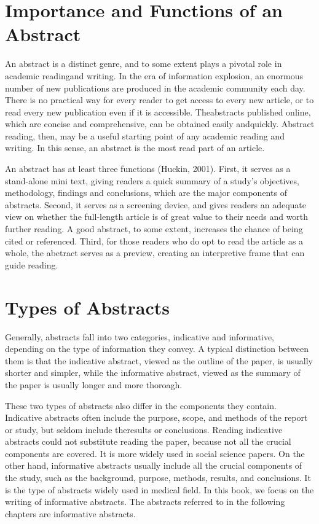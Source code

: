 \documentclass{ctexbook}
\begin{document}
\section{Importance and Functions of an Abstract}

An abstract is a distinct genre, and to some extent plays a pivotal role in academic readingand writing. In the era of information explosion, an enormous number of new publications are produced in the academic community each day. There is no practical way for every reader to get access to every new article, or to read every new publication even if it is accessible. Theabstracts published online, which are concise and comprehensive, can be obtained easily andquickly. Abstract reading, then, may be a useful starting point of any academic reading and writing. In this sense, an abstract is the most read part of an article.

An abstract has at least three functions (Huckin, 2001). First, it serves as a stand-alone mini text, giving readers a quick summary of a study's objectives, methodology, findings and conclusions, which are the major components of abstracts. Second, it serves as a screening device, and gives readers an adequate view on whether the full-length article is of great value to their needs and worth further reading. A good abstract, to some extent, increases the chance of being cited or referenced. Third, for those readers who do opt to read the article as a whole, the abetract serves as a preview, creating an interpretive frame that can guide reading.

\section{Types of Abstracts}

Generally, abstracts fall into two categories, indicative and informative, depending on the type of information they convey. A typical distinction between them is that the indicative abstract, viewed as the outline of the paper, is usually shorter and simpler, while the informative abstract, viewed as the summary of the paper is usually longer and more thoroagh. 

These two types of abstracts also differ in the components they contain. Indicative abstracts often include the purpose, scope, and methods of the report or study, but seldom include theresults or conclusions. Reading indicative abstracts could not substitute reading the paper, because not all the crucial components are covered. It is more widely used in social science papers. On the other hand, informative abstracts usually include all the crucial components of the study, such as the background, purpose, methods, results, and conclusions. It is the type of abstracts widely used in medical field. In this book, we focus on the writing of informative abstracts. The abstracts referred to in the following chapters are informative abstracts.
\end{document}
